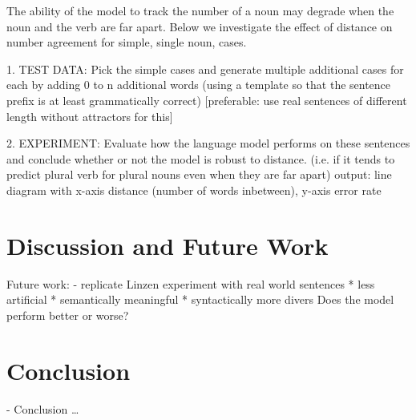 \documentclass[twoside]{article}
\begin{document}
\begin{multicols}{2}
The ability of the model to track the number of a noun may degrade
when the noun and the verb are far apart.
Below we investigate the effect of distance on number agreement for simple,
single noun, cases.

1. TEST DATA:
Pick the simple cases and generate multiple additional cases for each by adding 0 to n additional words (using a template so that the sentence prefix is at least grammatically correct)
[preferable: use real sentences of different length without attractors for this]

2. EXPERIMENT:
Evaluate how the language model performs on these sentences 
and conclude whether or not the model is robust to distance. 
(i.e. if it tends to predict plural verb for plural nouns even when they are far apart)
output: line diagram with x-axis distance (number of words inbetween), y-axis error rate





\section{Discussion and Future Work}
\label{discussion}

Future work: 
- replicate Linzen experiment with real world sentences
* less artificial
* semantically meaningful
* syntactically more divers
Does the model perform better or worse?

\section{Conclusion}
\label{conclusion}

- Conclusion \ldots








\end{multicols}


\end{document}
